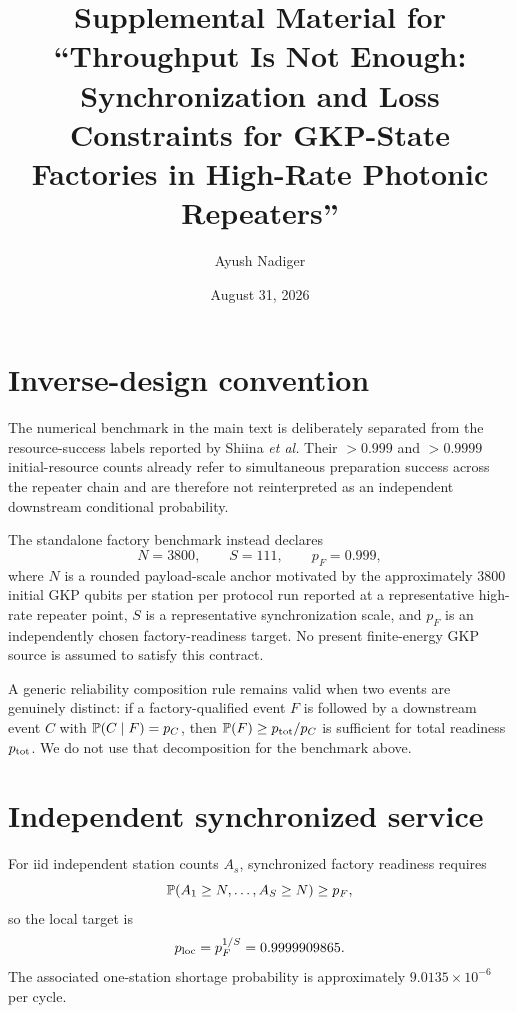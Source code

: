 \documentclass[aps,prx,preprint,superscriptaddress,nofootinbib,longbibliography]{revtex4-2}
\begin{document}
\title{Supplemental Material for ``Throughput Is Not Enough: Synchronization and Loss Constraints for GKP-State Factories in High-Rate Photonic Repeaters''}
\author{Ayush Nadiger}
\date{August 31, 2026}
\maketitle

\section{Inverse-design convention}
The numerical benchmark in the main text is deliberately separated from the resource-success labels reported by Shiina \emph{et al.} Their $>0.999$ and $>0.9999$ initial-resource counts already refer to simultaneous preparation success across the repeater chain and are therefore not reinterpreted as an independent downstream conditional probability.

The standalone factory benchmark instead declares
\begin{equation}
N=3800,\qquad S=111,\qquad p_F=0.999,
\end{equation}
where $N$ is a rounded payload-scale anchor motivated by the approximately 3800 initial GKP qubits per station per protocol run reported at a representative high-rate repeater point, $S$ is a representative synchronization scale, and $p_F$ is an independently chosen factory-readiness target. No present finite-energy GKP source is assumed to satisfy this contract.

A generic reliability composition rule remains valid when two events are genuinely distinct: if a factory-qualified event $F$ is followed by a downstream event $C$ with $\mathbb P(C\mid F)=p_C$, then $\mathbb P(F)\ge p_{\rm tot}/p_C$ is sufficient for total readiness $p_{\rm tot}$. We do not use that decomposition for the benchmark above.

\section{Independent synchronized service}
For iid independent station counts $A_s$, synchronized factory readiness requires
\begin{equation}
\mathbb P(A_1\ge N,\ldots,A_S\ge N)\ge p_F,
\end{equation}
so the local target is
\begin{equation}
p_{\rm loc}=p_F^{1/S}=0.9999909865.
\end{equation}
The associated one-station shortage probability is approximately $9.0135\times10^{-6}$ per cycle.
\end{document}
